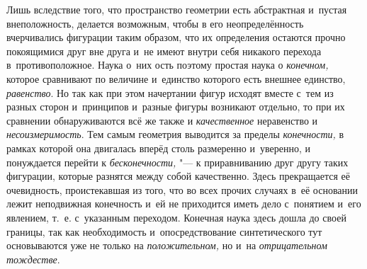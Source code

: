Лишь вследствие того, что пространство геометрии есть
абстрактная и~пустая внеположность, делается возможным, чтобы в
его неопределённость вчерчивались фигурации таким образом,
что их определения остаются прочно покоящимися друг вне друга и~не имеют
внутри себя никакого перехода в~противоположное. Наука о~них ость поэтому
простая наука о {\em конечном,}
которое сравнивают по величине и~единство которого есть
внешнее единство, {\em равенство}.
Но так как при этом начертании фигур исходят вместе с~тем из
разных сторон и~принципов и~разные фигуры возникают отдельно, то при их
сравнении обнаруживаются всё же также и
{\em качественное}
неравенство и
{\em несоизмеримость}.
Тем самым геометрия выводится за пределы
{\em конечности,} в
рамках которой она двигалась вперёд столь размеренно и~уверенно, и
понуждается перейти к
{\em бесконечности,} "--- к
приравниванию друг другу таких фигурации, которые разнятся между собой
качественно. Здесь прекращается её очевидность, проистекавшая из того, что
во всех прочих случаях в~её основании лежит неподвижная конечность и~ей не
приходится иметь дело с~понятием и~его явлением, т.~е. с~указанным
переходом. Конечная наука здесь дошла до своей границы, так как
необходимость и~опосредствование синтетического тут основываются уже не
только на {\em положительном,} но и~на {\em отрицательном тождестве}.

